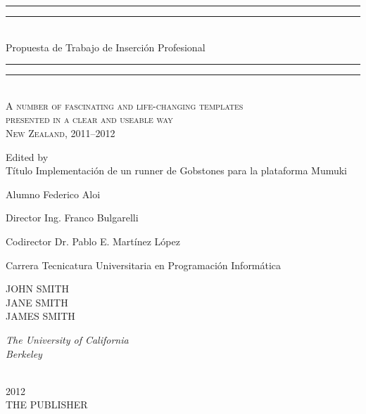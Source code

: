 \newcommand*{\titleGP}{\begingroup %
\centering %
\vspace*{\baselineskip} %

\rule{\textwidth}{1.6pt}\vspace*{-\baselineskip}\vspace*{2pt} %
\rule{\textwidth}{0.4pt}\\[\baselineskip] %

{\LARGE Propuesta de Trabajo de Inserción Profesional}

\rule{\textwidth}{0.4pt}\vspace*{-\baselineskip}\vspace{3.2pt} %
\rule{\textwidth}{1.6pt}\\[\baselineskip] %

\scshape %
A number of fascinating and life-changing templates \\ %
presented  in a clear and useable way \\[\baselineskip] %
New Zealand,  2011--2012\par %

\vspace*{2\baselineskip} %

Edited by \\[\baselineskip]

Título
Implementación de un runner de Gobstones para la plataforma Mumuki

Alumno
Federico Aloi

Director
Ing. Franco Bulgarelli

Codirector
Dr. Pablo E. Martínez López

Carrera
Tecnicatura Universitaria en Programación Informática

{\Large JOHN SMITH \\ JANE SMITH \\ JAMES SMITH\par} %
{\itshape The University of California \\ Berkeley\par} %

\vfill %

\plogo \\[0.3\baselineskip] %
{\scshape 2012} \\[0.3\baselineskip] %
{\large THE PUBLISHER}\par %

\endgroup}


 

\pagestyle{empty} %

\titleGP %

